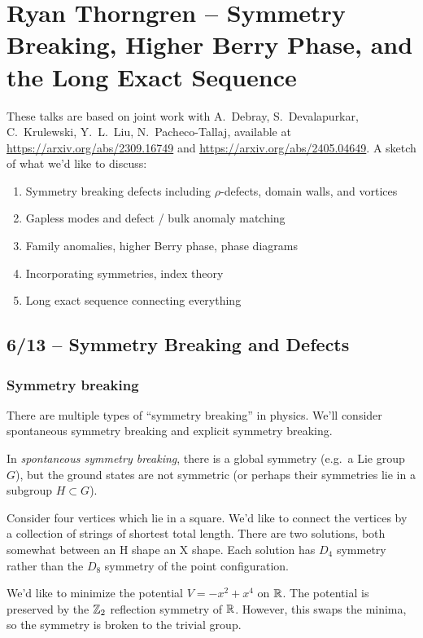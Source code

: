 \chapter{Ryan Thorngren -- Symmetry Breaking, Higher Berry Phase, and the Long Exact Sequence}

These talks are based on joint work with A.\ Debray, S.\ Devalapurkar, C.\ Krulewski, Y.\ L.\ Liu, N.\ Pacheco-Tallaj, available at \url{https://arxiv.org/abs/2309.16749} and \url{https://arxiv.org/abs/2405.04649}.
A sketch of what we'd like to discuss: 
\begin{enumerate}
	\item Symmetry breaking defects including $\rho$-defects, domain walls, and vortices
	\item Gapless modes and defect / bulk anomaly matching
	\item Family anomalies, higher Berry phase, phase diagrams
	\item Incorporating symmetries, index theory
	\item Long exact sequence connecting everything
\end{enumerate}

\section{6/13 -- Symmetry Breaking and Defects}

\subsection{Symmetry breaking}

There are multiple types of ``symmetry breaking'' in physics.
We'll consider spontaneous symmetry breaking and explicit symmetry breaking.

In \emph{spontaneous symmetry breaking}, there is a global symmetry (e.g.\ a Lie group $G$), but the ground states are not symmetric (or perhaps their symmetries lie in a subgroup $H \subset G$).

\begin{ex}
	Consider four vertices which lie in a square.
	We'd like to connect the vertices by a collection of strings of shortest total length.
	There are two solutions, both somewhat between an H shape an X shape.
	Each solution has $D_4$ symmetry rather than the $D_8$ symmetry of the point configuration.
\end{ex}

\begin{ex}
	We'd like to minimize the potential $V = -x^2 + x^4$ on $\mathbb{R}$.
	The potential is preserved by the $\mathbb{Z}_2$ reflection symmetry of $\mathbb{R}$.
	However, this swaps the minima, so the symmetry is broken to the trivial group.
\end{ex}

